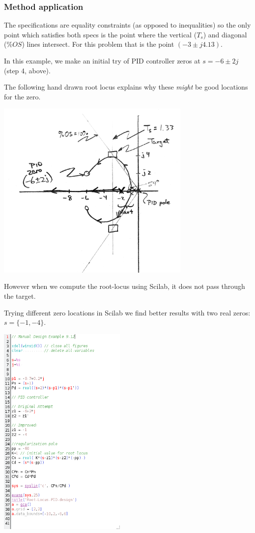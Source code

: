 % 
\begin{ExampleCont}

\subsubsection*{Method application}
The specifications are equality constraints (as opposed to inequalities) so the only point which satisfies both specs is the point where the vertical ($T_s$) and diagonal ($\%OS$) lines intersect.  For this problem that is the point $(-3 \pm j4.13)$.

In this example, we make an initial try of PID controller zeros at $s=-6\pm2j$ (step 4, above). 

The following hand drawn root locus explains why these {\it might} be good locations for the 
 zero.  

\includegraphics[width=95mm]{figs09/00823a.png}
 
However when we compute the root-locus using Scilab, it does not pass through the target.
  
Trying different zero locations in Scilab we find better results with two real 
zeros: $s= \{-1,-4\}$.

\includegraphics[width=62.5mm]{figs09/ex912ScilabCode.png}

\end{ExampleCont}

